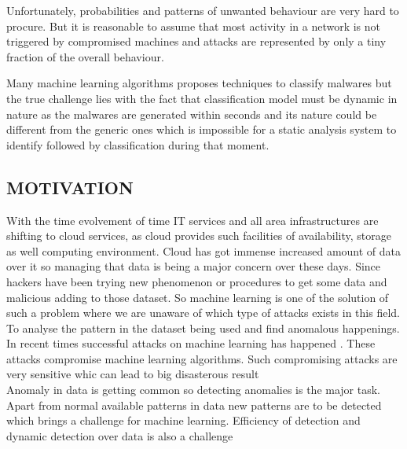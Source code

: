 \documentclass[a4paper, 12pt]{article}
\begin{document}
\par
Unfortunately, probabilities and patterns of unwanted behaviour are very hard to procure. But it is reasonable to assume that most activity in a network is not triggered by compromised machines and attacks are represented by only a tiny fraction of the overall behaviour. 
\\

\par
Many machine learning algorithms proposes techniques to classify malwares but
the true challenge lies with the fact that classification model must be dynamic
in nature as the malwares are generated within seconds and its nature could be
different from the generic ones which is impossible for a static analysis system to
identify followed by classification during that moment.


\newpage
\begin{center}

\section{MOTIVATION}

\end{center}

\hspace{1cm}
With the time evolvement of time IT services and all area infrastructures are shifting to cloud services, as cloud provides such facilities of availability, storage as well computing environment. Cloud has got immense increased amount of data over it so managing that data is being a major concern over these days. Since hackers have been trying new phenomenon or procedures to get some data and malicious adding to those dataset. So machine learning is one of the solution of such a problem where we are unaware of which type of attacks exists in this field. To analyse the pattern in the dataset being used and find anomalous happenings. \\

  

\hspace{1cm} 
In recent times successful attacks on machine learning has happened . These attacks compromise machine learning algorithms. Such compromising attacks are very sensitive whic can lead to big disasterous result\\

\hspace{1cm} Anomaly in data is getting common so detecting anomalies is the major task. Apart from normal available patterns in data new patterns are to be detected which brings a challenge for machine learning. Efficiency of detection and dynamic detection over data is also a challenge
\\
\end{document}
